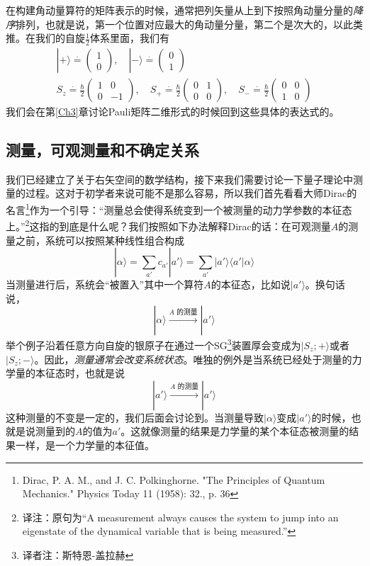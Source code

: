 \documentclass[UTF8,twoside]{ctexart}
\def\be{\begin{equation}}
\def\ee{\end{equation}}
\begin{document}
在构建角动量算符的矩阵表示的时候，通常把列矢量从上到下按照角动量分量的{\it 降序}排列，也就是说，第一个位置对应最大的角动量分量，第二个是次大的，以此类推。在我们的自旋$\frac{1}{2}$体系里面，我们有
\begin{subequations}
\begin{align}
|+\rangle\overset{\cdot}{=}\left(\begin{matrix}1\\0\end{matrix}\right),\quad |-\rangle \overset{\cdot}{=}\left(\begin{matrix}0\\1\end{matrix}\right)\\
S_z\overset{\cdot}{=}\frac{\hbar}{2}\left(\begin{matrix}1&0\\0&-1\end{matrix}\right),\quad S_+\overset{\cdot}{=}\frac{\hbar}{2}\left(\begin{matrix}0&1\\0&0\end{matrix}\right),\quad S_-\overset{\cdot}{=}\frac{\hbar}{2}\left(\begin{matrix}0&0\\1&0\end{matrix}\right)
\end{align}
\end{subequations}
我们会在第\ref{Ch3}章讨论Pauli矩阵二维形式的时候回到这些具体的表达式的。

\subsection{测量，可观测量和不确定关系}\label{s1.4}


我们已经建立了关于右矢空间的数学结构，接下来我们需要讨论一下量子理论中测量的过程。这对于初学者来说可能不是那么容易，所以我们首先看看大师Dirac的名言\footnote{Dirac, P. A. M., and J. C. Polkinghorne. "The Principles of Quantum Mechanics." Physics Today 11 (1958): 32., p. 36}作为一个引导：``测量总会使得系统变到一个被测量的动力学参数的本征态上。''\footnote{译注：原句为``A measurement always causes the system to jump into an eigenstate of the dynamical variable that is being measured.''}这指的到底是什么呢？我们按照如下办法解释Dirac的话：在可观测量$A$的测量之前，系统可以按照某种线性组合构成
\be\label{1.4.1}
|\alpha\rangle = \sum_{a'}c_{a'}|a'\rangle = \sum_{a'}|a'\rangle\langle a'|\alpha\rangle
\ee
当测量进行后，系统会``被置入''其中一个算符$A$的本征态，比如说$|a'\rangle $。换句话说，
\be
|\alpha\rangle\xrightarrow[]{A\text{ 的测量}}|a'\rangle
\ee
举个例子沿着任意方向自旋的银原子在通过一个SG\footnote{译者注：斯特恩-盖拉赫}装置厚会变成为$|S_z;+\rangle$或者$|S_z;-\rangle$。因此，{\it 测量通常会改变系统状态}。唯独的例外是当系统已经处于测量的力学量的本征态时，也就是说
\be
|a'\rangle\xrightarrow[]{A\text{ 的测量}}|a'\rangle
\ee
这种测量的不变是一定的，我们后面会讨论到。当测量导致$|\alpha\rangle$变成$|a'\rangle$的时候，也就是说测量到的$A$的值为$a'$。这就像测量的结果是力学量的某个本征态被测量的结果一样，是一个力学量的本征值。
\end{document}
